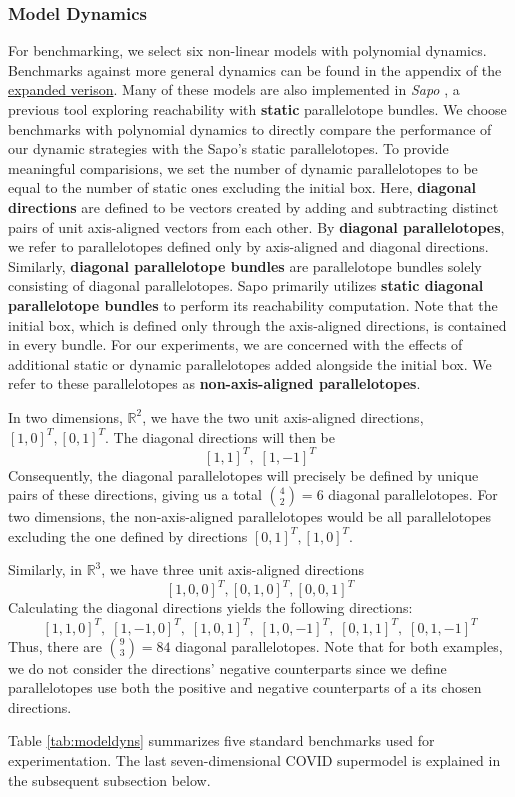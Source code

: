 \subsubsection{Model Dynamics}
For benchmarking, we select six non-linear models with polynomial dynamics. Benchmarks against more general dynamics can be found in the appendix of the \href{https://arxiv.org/abs/2105.11796}{expanded verison}.
%
Many of these models are also implemented in \emph{Sapo} \cite{dreossi2017sapo}, a previous tool exploring reachability with {\bf static} parallelotope bundles.
%
We choose benchmarks with polynomial dynamics to directly compare the performance of our dynamic strategies with the Sapo's static parallelotopes. To provide meaningful comparisions, we set the number of dynamic parallelotopes to be equal to the number of static ones excluding the initial box. Here, {\bf diagonal directions} are defined to be vectors created by adding and subtracting distinct pairs of unit axis-aligned vectors from each other.
%
By {\bf diagonal parallelotopes}, we refer to parallelotopes defined only by axis-aligned and diagonal directions. Similarly, {\bf diagonal parallelotope bundles} are parallelotope bundles solely consisting of diagonal parallelotopes. Sapo primarily utilizes {\bf static diagonal parallelotope bundles} to perform its reachability computation.
Note that the initial box, which is defined only through the axis-aligned directions, is contained in every bundle.
%
For our experiments, we are concerned with the effects of additional static or dynamic parallelotopes added alongside the initial box. We refer to these parallelotopes as {\bf non-axis-aligned parallelotopes}.

\begin{example}
In two dimensions, $\mathbb{R}^2$, we have the two unit axis-aligned directions, $[1,0]^T, [0,1]^T$. The diagonal directions will then be
\[ [1,1]^T, \; [1,-1]^T\]
Consequently, the diagonal parallelotopes will precisely be defined by unique pairs of these directions, giving us a total ${4 \choose 2} = 6$ diagonal parallelotopes.
%
For two dimensions, the non-axis-aligned parallelotopes would be all parallelotopes excluding the one defined by directions $[0,1]^T, [1,0]^T$. \newline

\noindent Similarly, in $\mathbb{R}^3$, we have three unit axis-aligned directions
%
\[ [1,0,0]^T, [0,1,0]^T,[0,0,1]^T \]
%
Calculating the diagonal directions yields the following directions:
%
\[ [1,1,0]^T, \; [1,-1,0]^T, \; [1,0,1]^T,\;  [1,0,-1]^T,\;  [0,1,1]^T, \; [0,1,-1]^T \]
%
Thus, there are ${9 \choose 3} = 84$ diagonal parallelotopes.
%
Note that for both examples, we do not consider the directions' negative counterparts since we define parallelotopes use both the positive and negative counterparts of a its chosen directions.
\end{example}
Table \ref{tab:modeldyns} summarizes five standard benchmarks used for experimentation. The last seven-dimensional COVID supermodel is explained in the subsequent subsection below.

